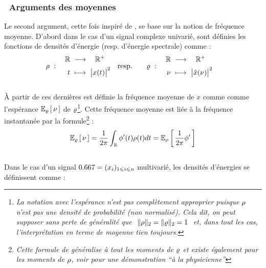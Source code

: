 \subsubsection*{\textbullet\ Arguments des moyennes}

Le second argument, cette fois inspiré de \cite{cano_mathematical_2022}, se base sur la notion de fréquence moyenne.
D'abord dans le cas d'un signal complexe univarié, sont définies les fonctions de densités d'énergie (resp. d'énergie spectrale) comme :
\begin{align}\label{eq:densi_dE}
	\densit\ &:\quad \begin{aligned}\R\ &\lr\quad \R^+ \\ t\ &\longmapsto\ \big|x(t)\big|^2 \end{aligned}  
	&
	\text{resp.}\qquad \densis\ &:\quad \begin{aligned}\R\ &\lr\quad \R^+ \\ \nu\ &\longmapsto\ \big|\fou{x}(\nu)\big|^2 \end{aligned}
\end{align}
\\
À partir de ces dernières est définie la fréquence moyenne de $x$ comme comme l'espérance $\esp[\densis]{\nu}$ de $\densis$\footnote{\itshape
	La notation avec l'espérance n'est pas complètement approprier puisque $\densit$ n'est pas une densité de probabilité (non normalisé). Cela dit, on peut supposer sans perte de généralité que $\ \|\densit\|_2 = \|\densis\|_2 = 1\ $ et, dans tout les cas, l'interprétation en terme de moyenne tien toujours.
}. Cette fréquence moyenne est liée à la fréquence instantanée par la formule\footnote{\itshape
	Cette formule de généralise à tout les moments de $\densis$ et existe également pour les moments de $\densit$, voir \cite[sec. 1.4]{cohen_time_1995} pour une démonstration ``à la physicienne''
} :
\begin{equation}\label{eq:esp_freq}
	\esp[\densis]{\nu} = \frac{1}{2\pi}\int_\R \phi'(t)\densit(t)dt = \esp[\densit]{\frac{1}{2\pi} \phi'}
\end{equation}
\\
Dans le cas d'un signal $\x=(x_i)_{1\leq i\leq n}$ multivarié, les densités d'énergies se définissent comme :
